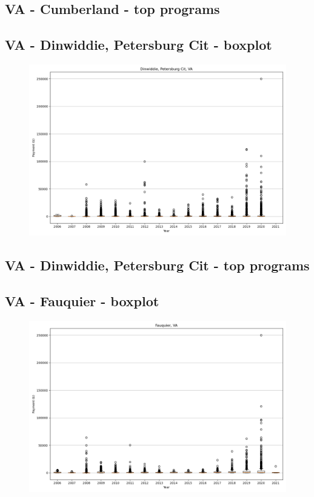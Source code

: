 \subsection*{VA - Cumberland - top programs}

\newpage
\subsection*{VA - Dinwiddie, Petersburg Cit - boxplot}
\begin{figure}[h]
\centering
\includegraphics[width=7in]{../output/boxplots/counties/Dinwiddie, Petersburg Cit-VA_boxplot.png}
\end{figure}


\subsection*{VA - Dinwiddie, Petersburg Cit - top programs}

\newpage
\subsection*{VA - Fauquier - boxplot}
\begin{figure}[h]
\centering
\includegraphics[width=7in]{../output/boxplots/counties/Fauquier-VA_boxplot.png}
\end{figure}


